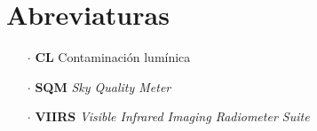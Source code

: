 \chapter{Abreviaturas}

\begin{itemize}

\item[$\cdot$] \textbf{CL} Contaminación lumínica
		
\item[$\cdot$] \textbf{SQM} \textit{Sky Quality Meter}
		
\item[$\cdot$] \textbf{VIIRS} \textit{Visible Infrared Imaging Radiometer Suite} 
		
\end{itemize}